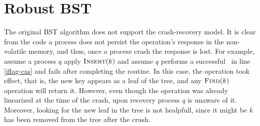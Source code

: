 %
%
\newcommand{\debug}[1]{#1}
%

\newcommand{\lcomment}[1]{\debug{\comment{$\rightarrow$ #1}}}
\newcommand{\incomment}[1]{\debug{[[[#1]]]}}
%
\newcommand{\fM}[1]{\comment{#1 5-14 M.}}
\newcommand{\fD}[1]{\comment{#1 5-21 D.}}
\newcommand{\upcom}[1]{#1}
%



\newenvironment{remark}{\begin{trivlist}
		\item[\hspace{\labelsep}{\bf\noindent Remark. }]}{\end{trivlist}}
%
%

\newenvironment{centre}{\begin{center}}{\end{center}}



\newcommand{\comment}[1]{\marginpar{\tiny #1}}
\newcommand{\mnote}[1]
{\marginpar%
	[{\tiny\begin{minipage}[t]{\marginparwidth}\raggedright#1%
	\end{minipage}}]%
	{\tiny\begin{minipage}[t]{\marginparwidth}\raggedright#1%
	\end{minipage}}%
}



\newcommand{\ignore}[1]{}
\newcommand{\floor}[1]{\left\lfloor #1 \right\rfloor}

\newcommand{\lft}{\mbox{\it left}}




\section{Robust BST}

The original BST algorithm does not support the crash-recovery model. It is clear from the code a process does not persist the operation's response in the non-volatile memory, and thus, once a process crash the response is lost. For example, assume a process $q$ apply $\mbox{\sc Insert} (k)$ and assume $q$ performs a successful \CASB\ in line \ref{iflag-cas} and fails after completing the  routine. In this case, the  operation took effect, that is, the new key appears as a leaf of the tree, and any $\mbox{\sc Find} (k)$ operation will return it. However, even though the operation was already linearized at the time of the crash, upon recovery process $q$ is unaware of it. Moreover, looking for the new leaf in the tree is not healpfull, since it might be $k$ has been removed from the tree after the crush.

